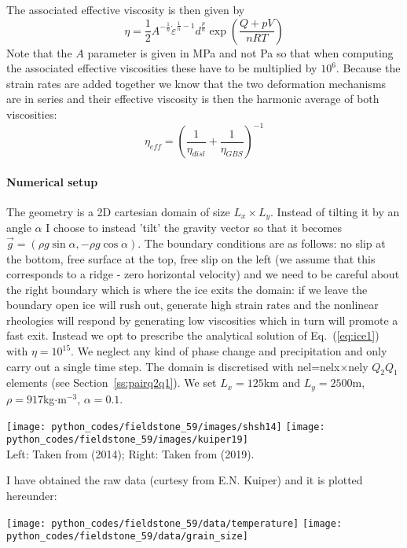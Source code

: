 The associated effective viscosity is then given by 
\[
\eta = \frac{1}{2}  A^{-\frac{1}{n}} \dot{\varepsilon}^{\frac{1}{n}-1}  d^{\frac{p}{n}} \exp \left( \frac{Q+pV}{nRT} \right)
\]
Note that the $A$ parameter is given in MPa and not Pa so that when computing the 
associated effective viscosities these have to be multiplied by $10^6$.
Because the strain rates are added together we know that the two deformation mechanisms are in series and their
effective viscosity is then the harmonic average of both viscosities:
\[
\eta_{eff} = \left(\frac{1}{\eta_{disl}} + \frac{1}{\eta_{GBS}}  \right)^{-1}
\]

\paragraph{Numerical setup}

The geometry is a 2D cartesian domain of size $L_x \times L_y$. Instead of tilting it by an angle $\alpha$
I choose to instead 'tilt' the gravity vector so that it becomes 
$\vec{g}=(\rho g \sin\alpha,-\rho g\cos\alpha)$.
The boundary conditions are as follows: no slip at the bottom, free surface at the top, 
free slip on the left (we assume that this corresponds to a ridge - zero horizontal velocity)
and we need to be careful about the right boundary which is where the ice exits the domain:
if we leave the boundary open ice will rush out, generate high strain rates and the nonlinear 
rheologies will respond by generating low viscosities which in turn will promote a fast 
exit. Instead we opt to prescribe the analytical solution of Eq.~(\ref{eq:ice1}) with $\eta=10^{15}$.
We neglect any kind of phase change and precipitation and only carry out a single time step.
The domain is discretised with nel=nelx$\times$nely $Q_2Q_1$ elements (see Section~\ref{ss:pairq2q1}).
We set $L_x=125$km and $L_y=2500$m, $\rho=917$kg$\cdot$m$^{-3}$, $\alpha=0.1$\degree.



\begin{center}
\texttt{[image: python\_codes/fieldstone\_59/images/shsh14]}
\texttt{[image: python\_codes/fieldstone\_59/images/kuiper19]}\\
{\captionfont Left: Taken from \textcite{shsh14} (2014); 
Right: Taken from \textcite{kuiper19} (2019).}
\end{center}

I have obtained the raw data (curtesy from E.N. Kuiper) and it is plotted hereunder:
\begin{center}
\texttt{[image: python\_codes/fieldstone\_59/data/temperature]}
\texttt{[image: python\_codes/fieldstone\_59/data/grain\_size]}
\end{center}

